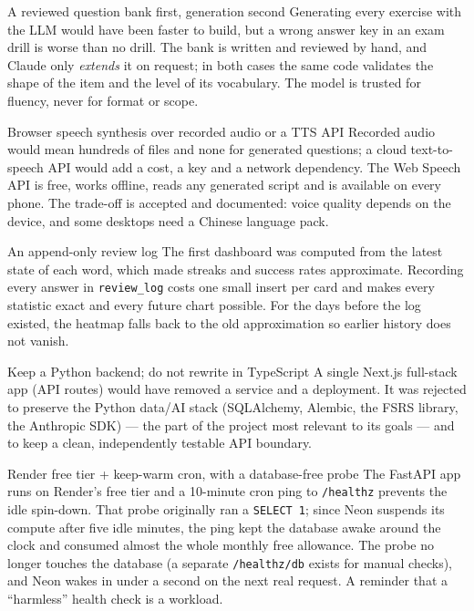\documentclass[11pt,a4paper]{article}
\begin{document}
\begin{decision}{A reviewed question bank first, generation second}
Generating every exercise with the LLM would have been faster to build, but a
wrong answer key in an exam drill is worse than no drill. The bank is written
and reviewed by hand, and Claude only \emph{extends} it on request; in both
cases the same code validates the shape of the item and the level of its
vocabulary. The model is trusted for fluency, never for format or scope.
\end{decision}

\begin{decision}{Browser speech synthesis over recorded audio or a TTS API}
Recorded audio would mean hundreds of files and none for generated questions; a
cloud text-to-speech API would add a cost, a key and a network dependency.
The Web Speech API is free, works offline, reads any generated script and is
available on every phone. The trade-off is accepted and documented: voice
quality depends on the device, and some desktops need a Chinese language pack.
\end{decision}

\begin{decision}{An append-only review log}
The first dashboard was computed from the latest state of each word, which made
streaks and success rates approximate. Recording every answer in
\texttt{review\_log} costs one small insert per card and makes every statistic
exact and every future chart possible. For the days before the log existed, the
heatmap falls back to the old approximation so earlier history does not vanish.
\end{decision}

\begin{decision}{Keep a Python backend; do not rewrite in TypeScript}
A single Next.js full-stack app (API routes) would have removed a service and a
deployment. It was rejected to preserve the Python data/AI stack (SQLAlchemy,
Alembic, the FSRS library, the Anthropic SDK) --- the part of the project most
relevant to its goals --- and to keep a clean, independently testable API
boundary.
\end{decision}

\begin{decision}{Render free tier + keep-warm cron, with a database-free probe}
The FastAPI app runs on Render's free tier and a 10-minute cron ping to
\texttt{/healthz} prevents the idle spin-down. That probe originally ran a
\texttt{SELECT 1}; since Neon suspends its compute after five idle minutes, the
ping kept the database awake around the clock and consumed almost the whole
monthly free allowance. The probe no longer touches the database (a separate
\texttt{/healthz/db} exists for manual checks), and Neon wakes in under a
second on the next real request. A reminder that a ``harmless'' health check is
a workload.
\end{decision}
\end{document}
